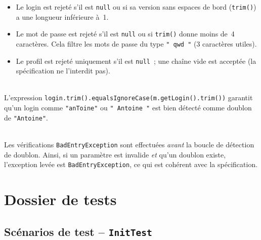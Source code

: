 \documentclass[12pt,a4paper]{article}
\begin{document}
\begin{description}[leftmargin=2cm, labelwidth=1.8cm]

  \item[Validation stricte] \hfill 
    \begin{itemize}[noitemsep, topsep=0pt, leftmargin=*]
      \item Le login est rejeté s'il est \texttt{null} ou si sa version sans espaces de bord
            (\texttt{trim()}) a une longueur inférieure à~1.
      \item Le mot de passe est rejeté s'il est \texttt{null} ou si \texttt{trim()} donne
            moins de~4 caractères. Cela filtre les mots de passe du type \texttt{"   qwd "}
            (3 caractères utiles).
      \item Le profil est rejeté uniquement s'il est \texttt{null}~; une chaîne vide est
            acceptée (la spécification ne l'interdit pas).
    \end{itemize}

  \item[Comparaison] \hfill \\
    L'expression \texttt{login.trim().equalsIgnoreCase(m.getLogin().trim())} garantit
    qu'un login comme \texttt{"anToine"} ou \texttt{" Antoine "} est bien détecté comme
    doublon de \texttt{"Antoine"}.

  \item[Ordre] \hfill \\
    Les vérifications \texttt{BadEntryException} sont effectuées
    \emph{avant} la boucle de détection de doublon. Ainsi, si un paramètre est invalide
    \emph{et} qu'un doublon existe, l'exception levée est \texttt{BadEntryException}, ce qui
    est cohérent avec la spécification.
    
\end{description}

\section{Dossier de tests}

\subsection{Scénarios de test -- \texttt{InitTest}}
\end{document}

